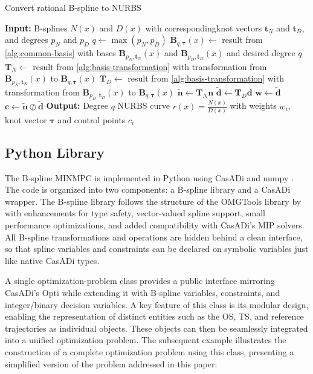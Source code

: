 \begin{algorithm}
    \caption{Convert rational B-spline to NURBS}\label{alg:nurbs-conversion}
    \begin{algorithmic}[1]
        \State \textbf{Input:} B-splines $N(x)$ and $D(x)$ with correspondingknot vectors $\mathbf t_N$ and $\mathbf t_D$, and degrees $p_N$ and $p_D$
        \State $q \gets \max(p_N, p_D)$
        \State $\mathbf B_{q,\boldsymbol{\tau}}(x) \gets $ result from \cref{alg:common-basis} with bases $\mathbf B_{p_N,\mathbf t_N}(x)$ and $\mathbf B_{p_D,\mathbf t_D}(x)$ and desired degree $q$
        \State $\mathbf T_N \gets $ result from \cref{alg:basis-transformation} with transformation from $\mathbf B_{p_N,\mathbf t_N}(x)$ to $\mathbf B_{q,\boldsymbol{\tau}}(x)$
        \State $\mathbf T_D \gets $ result from \cref{alg:basis-transformation} with transformation from $\mathbf B_{p_D,\mathbf t_D}(x)$ to $\mathbf B_{q,\boldsymbol{\tau}}(x)$
        \State $\mathbf{\tilde n} \gets \mathbf T_N \mathbf n$
        \State $\mathbf{\tilde d} \gets \mathbf T_D \mathbf d$
        \State $\mathbf w \gets \mathbf{\tilde d}$
        \State $\mathbf c \gets \mathbf{\tilde n} \oslash \mathbf{\tilde d}$ 
        \State \textbf{Output:} Degree $q$ NURBS curve $\displaystyle r(x) = \frac{N(x)}{D(x)}$ with weights $w_i$, knot vector $\boldsymbol{\tau}$ and control points $c_i$
    \end{algorithmic}
\end{algorithm}



\subsection{Python Library}\label{sec:python-implementation}

The B-spline MINMPC is implemented in Python using CasADi \citep{casadi} and numpy \citep{numpy}. The code is organized into two components: a B-spline library and a CasADi wrapper. The B-spline library follows the structure of the OMGTools library by \citet{mercy2016spline} with enhancements for type safety, vector-valued spline support, small performance optimizations, and added compatibility with CasADi’s MIP solvers. All B-spline transformations and operations are hidden behind a clean interface, so that spline variables and constraints can be declared on symbolic variables just like native CasADi types.

A single optimization-problem class provides a public interface mirroring CasADi’s Opti while extending it with B-spline variables, constraints, and integer/binary decision variables. 
A key feature of this class is its modular design, enabling the representation of distinct entities such as the OS, TS, and reference trajectories as individual objects. These objects can then be seamlessly integrated into a unified optimization problem.  The subsequent example illustrates the construction of a complete optimization problem using this class, presenting a simplified version of the problem addressed in this paper:

